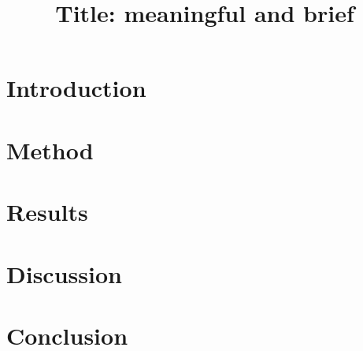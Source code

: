 \documentclass{article}
\begin{document}
\title{Title: meaningful and brief}

\maketitle

\begin{abstract}
\end{abstract}

\section{Introduction}



\section{Method}



\section{Results}


\section{Discussion}


\section{Conclusion}




\end{document}
